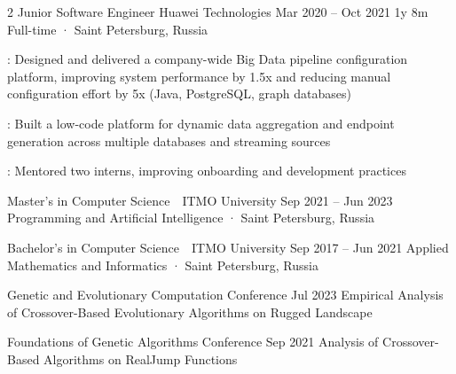 \documentclass[11pt, a4paper]{style}
\begin{document}
\begin{paracol}{2}
    \cvEntry
        {Junior Software Engineer} {Huawei Technologies}
        {Mar 2020 -- Oct 2021} {1y 8m}
        {Full-time · Saint Petersburg, Russia}
        {
            \begin{cvItems}
                \item {}: Designed and delivered a company-wide Big Data pipeline configuration platform, improving system performance by 1.5x and reducing manual configuration effort by 5x (Java, PostgreSQL, graph databases)
                \item {}: Built a low-code platform for dynamic data aggregation and endpoint generation across multiple databases and streaming sources
                \item {}: Mentored two interns, improving onboarding and development practices
            \end{cvItems}
        }


    \cvEntry
        {} {Master's in Computer Science\ \textbar\ ITMO University}
        {Sep 2021 -- Jun 2023} {}
        {Programming and Artificial Intelligence · Saint Petersburg, Russia}
        {}

    \cvEntry
        {}{Bachelor's in Computer Science\ \textbar\ ITMO University}
        {Sep 2017 -- Jun 2021} {}
        {Applied Mathematics and Informatics · Saint Petersburg, Russia}
        {}


    \cvEntry
        {} {Genetic and Evolutionary Computation Conference}
        {Jul 2023} {} {}
        {
            \vspace{-1mm}
            Empirical Analysis of Crossover-Based Evolutionary Algorithms on Rugged Landscape
        }

    \cvEntry
        {} {Foundations of Genetic Algorithms Conference}
        {Sep 2021} {} {}
        {
            \vspace{-1mm}
            Analysis of Crossover-Based Algorithms on RealJump Functions
        }


\switchcolumn



    \begin{cvSummary}
    \end{cvSummary}



\end{paracol}
\end{document}
